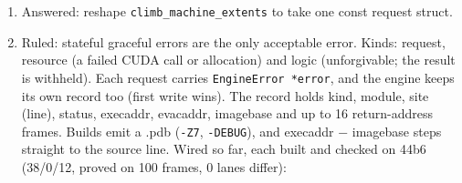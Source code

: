 \begin{enumerate}
\item Answered: reshape \texttt{climb\_\allowbreak{}machine\_\allowbreak{}extents} to take one const request struct.
\item Ruled: stateful graceful errors are the only acceptable error. Kinds: request, resource (a failed CUDA call or allocation) and logic (unforgivable; the result is withheld). Each request carries \texttt{Engine\allowbreak{}Error *error}, and the engine keeps its own record too (first write wins). The record holds kind, module, site (line), status, execaddr, evacaddr, imagebase and up to 16 return-address frames. Builds emit a .pdb (\texttt{-\allowbreak{}Z7}, \texttt{-\allowbreak{}DEBUG}), and execaddr − imagebase steps straight to the source line. Wired so far, each built and checked on 44b6 (38/0/12, proved on 100 frames, 0 lanes differ):
\end{enumerate}

